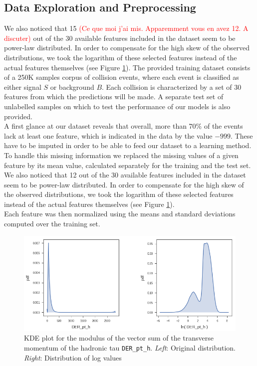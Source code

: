 \documentclass[10pt,conference,compsocconf]{IEEEtran}
\begin{document}
\subsection{Data Exploration and Preprocessing}
We also noticed that 15 \textcolor{red}{(Ce que moi j'ai mis. Apparemment vous en avez 12. A discuter) } out of the 30 available features included in the dataset seem to be power-law distributed. In order to compensate for the high skew of the observed distributions, we took the logarithm of these selected features instead of the actual features themselves (see Figure \ref{fig_kde}).
The provided training dataset consists of a 250K samples corpus of collision events, where each event is classified as either signal $S$ or background $B$. Each collision is characterized by a set of 30 features from which the predictions will be made. A separate test set of unlabelled samples on which to test the performance of our models is also provided. \\
A first glance at our dataset reveals that overall,
more than 70\% of the events lack at least one feature, which is indicated in the data  by the value $-999$. These have to be imputed in order to be able to feed our dataset to a learning method. To handle this missing information we replaced the missing values of a given feature by its mean value, calculated separately for the training and the test set. \\
We also noticed that 12 out of the 30 available features included in the dataset seem to be power-law distributed. In order to compensate for the high skew of the observed distributions, we took the logarithm of these selected features instead of the actual features themselves (see Figure \ref{fig_kde}).\\ Each feature was then normalized using the means and standard deviations computed over the training set. 

\begin{figure}[htb]
\centering
\includegraphics[width=\linewidth]{kdeplot.png}

\cprotect\caption{KDE plot for the modulus of the vector sum of the transverse momentum of the hadronic tau \verb+DER_pt_h+.
\emph{Left}: Original distribution. \emph{Right}:  Distribution of log values}
\label{fig_kde}
\end{figure}
\end{document}
